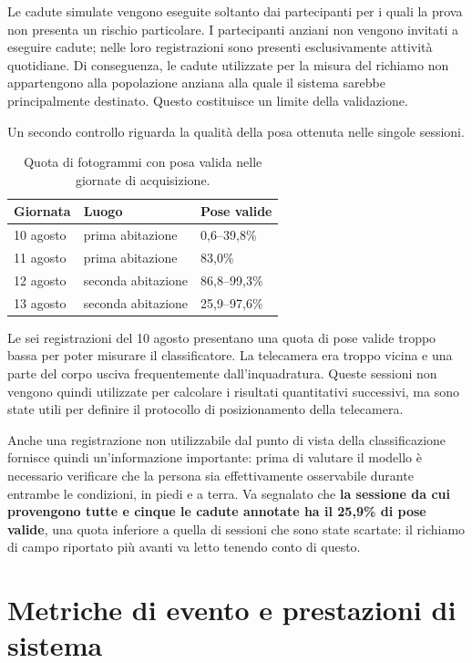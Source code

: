 Le cadute simulate vengono eseguite soltanto dai partecipanti per i quali la prova non presenta un rischio particolare. I partecipanti anziani non vengono invitati a eseguire cadute; nelle loro registrazioni sono presenti esclusivamente attività quotidiane. Di conseguenza, le cadute utilizzate per la misura del richiamo non appartengono alla popolazione anziana alla quale il sistema sarebbe principalmente destinato. Questo costituisce un limite della validazione.

Un secondo controllo riguarda la qualità della posa ottenuta nelle singole sessioni.

\begin{table}[ht]
\centering
\caption{Quota di fotogrammi con posa valida nelle giornate di acquisizione.}
\label{tab:qualita_sessioni}
\begin{tabular}{lll}
\toprule
\textbf{Giornata} & \textbf{Luogo} & \textbf{Pose valide} \\
\midrule
10 agosto & prima abitazione & 0,6--39,8\% \\
11 agosto & prima abitazione & 83,0\% \\
12 agosto & seconda abitazione & 86,8--99,3\% \\
13 agosto & seconda abitazione & 25,9--97,6\% \\
\bottomrule
\end{tabular}
\end{table}

Le sei registrazioni del 10 agosto presentano una quota di pose valide troppo bassa per poter misurare il classificatore. La telecamera era troppo vicina e una parte del corpo usciva frequentemente dall'inquadratura. Queste sessioni non vengono quindi utilizzate per calcolare i risultati quantitativi successivi, ma sono state utili per definire il protocollo di posizionamento della telecamera.

Anche una registrazione non utilizzabile dal punto di vista della classificazione fornisce quindi un'informazione importante: prima di valutare il modello è necessario verificare che la persona sia effettivamente osservabile durante entrambe le condizioni, in piedi e a terra. Va segnalato che \textbf{la sessione da cui provengono tutte e cinque le cadute annotate ha il 25,9\% di pose valide}, una quota inferiore a quella di sessioni che sono state scartate: il richiamo di campo riportato più avanti va letto tenendo conto di questo.

\section{Metriche di evento e prestazioni di sistema}
\label{sec:falsi-allarmi}
\label{sec:finestre-eventi}

